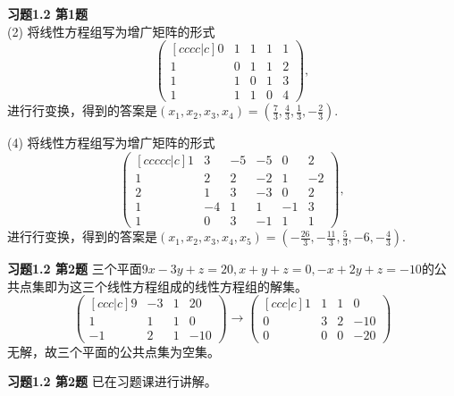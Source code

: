 
\renewcommand{\newpageorvspace}{\vspace{2em}}

\date{第一次作业}



\maketitle

{\bf 习题1.2 第1题}\\
(2) 将线性方程组写为增广矩阵的形式
$$\begin{pmatrix}[cccc|c] 0 & 1 & 1 & 1 & 1 \\ 1 & 0 & 1 & 1 & 2 \\ 1 & 1 & 0 & 1 & 3 \\ 1 & 1 & 1 & 0 & 4 \end{pmatrix},$$
进行行变换，得到的答案是$(x_1, x_2, x_3, x_4) = (\frac{7}{3}, \frac{4}{3}, \frac{1}{3}, -\frac{2}{3})$.

(4) 将线性方程组写为增广矩阵的形式
$$\begin{pmatrix}[ccccc|c] 1 & 3 & -5 & -5 & 0 & 2 \\ 1 & 2 & 2 & -2 & 1 & -2 \\ 2 & 1 & 3 & -3 & 0 & 2 \\ 1 & -4 & 1 & 1 & -1 & 3 \\ 1 & 0 & 3 & -1 & 1 & 1 \end{pmatrix},$$
进行行变换，得到的答案是$(x_1, x_2, x_3, x_4, x_5) = (-\frac{26}{3}, -\frac{11}{3}, \frac{5}{3}, -6, -\frac{4}{3})$.

\newpageorvspace

{\bf 习题1.2 第2题} 三个平面$9x-3y+z=20, x+y+z=0, -x+2y+z=-10$的公共点集即为这三个线性方程组成的线性方程组的解集。
$$\begin{pmatrix}[ccc|c] 9 & -3 & 1 & 20 \\ 1 & 1 & 1 & 0 \\ -1 & 2 & 1 & -10 \end{pmatrix} \to \begin{pmatrix}[ccc|c] 1 & 1 & 1 & 0 \\ 0 & 3 & 2 & -10 \\ 0 & 0 & 0 & -20 \end{pmatrix}$$
无解，故三个平面的公共点集为空集。

{\bf 习题1.2 第2题} 已在习题课进行讲解。

\newpageorvspace

